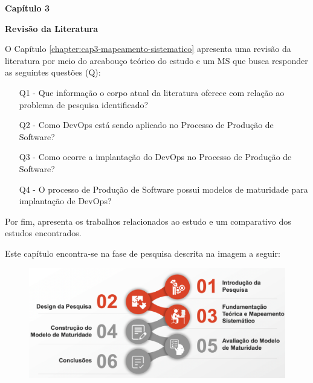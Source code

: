 \newpage


\begin{center}
\newpage
\thispagestyle{plain}
\textbf{\Huge Capítulo 3}
\end{center}
\begin{center}
\textbf{\Huge Revisão da Literatura}
\end{center}
\noindent\makebox[\linewidth]{\rule{\textwidth}{1pt}} 
\begin{flushleft}
O Capítulo \ref{chapter:cap3-mapeamento-sistematico} apresenta uma revisão da literatura por meio do arcabouço teórico do estudo e um MS que busca responder as seguintes questões (Q):

\begin{itemize}
    \item[Q1 -] Que informação o corpo atual da literatura oferece com relação ao problema de pesquisa identificado?
    \item[Q2 -] Como DevOps está sendo aplicado no Processo de Produção de Software?
    \item[Q3 -] Como ocorre a implantação do DevOps no Processo de Produção de Software?
    \item[Q4 -] O processo de Produção de Software possui modelos de maturidade para implantação de DevOps?
\end{itemize}

Por fim, apresenta os trabalhos relacionados ao estudo e um comparativo dos estudos encontrados.
\end{flushleft}
\noindent\makebox[\linewidth]{\rule{\textwidth}{1pt}} 

Este capítulo encontra-se na fase de pesquisa descrita na imagem a seguir:
\begin{figure}[ht]
\centering
\includegraphics[width=15cm]{images/part-capitulo3.png}
\label{fig:metodologia-cap2}
\end{figure}